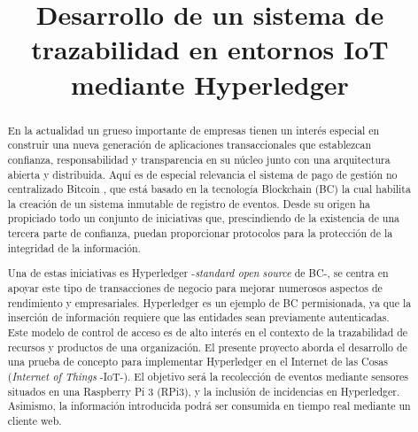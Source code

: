 \documentclass[10pt,conference,a4paper]{IEEEtran}
\begin{document}
\title{Desarrollo de un sistema de trazabilidad en entornos IoT mediante Hyperledger}

\author{
\and
{}
}

\maketitle

\begin{abstract}
    En la actualidad un grueso importante de empresas tienen un
    interés especial en construir una nueva generación de aplicaciones
    transaccionales que establezcan confianza, responsabilidad y
    transparencia en su núcleo junto con una arquitectura abierta y
    distribuida. Aquí es de especial relevancia el sistema de pago de
    gestión no centralizado Bitcoin \cite{franco:2014:UB}, que está basado
    en la tecnología Blockchain (BC) la cual habilita la creación de un
    sistema inmutable de registro de eventos. Desde su origen ha
    propiciado todo un conjunto de iniciativas que, prescindiendo de la
    existencia de una tercera parte de confianza, puedan
    proporcionar protocolos para la protección de la integridad de la
    información.

    Una de estas iniciativas es Hyperledger \cite{hyperledger:url}
    -\textit{standard open source} de BC-, se centra en apoyar
    este tipo de transacciones de negocio para mejorar numerosos
    aspectos de rendimiento y empresariales. Hyperledger es un ejemplo
    de BC permisionada, ya que la inserción de
    información requiere que las entidades sean previamente
    autenticadas. Este modelo de control de acceso es de alto interés
    en el contexto de la trazabilidad de recursos y productos de una
    organización. El presente proyecto aborda el desarrollo de una
    prueba de concepto para implementar Hyperledger en el Internet de
    las Cosas (\emph{Internet of Things} -IoT-). El objetivo será la recolección de eventos mediante sensores situados en una Raspberry Pi 3 (RPi3), y la inclusión de
    incidencias en Hyperledger. Asimismo, la información introducida
    podrá ser consumida en tiempo real mediante un cliente web.
    
\end{abstract}
\end{document}
